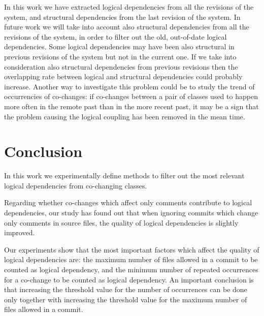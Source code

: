 \documentclass[conference]{IEEEtran}
\begin{document}
In this work we have extracted logical dependencies from all the revisions of the system, and structural dependencies from the last revision of the system. In future work we will take into account also structural dependencies from all the revisions of the system, in order to filter out the old, out-of-date logical dependencies.  Some logical dependencies may have been also structural in previous revisions of the system but not in the current one. If we take into consideration also structural dependencies from previous revisions then the overlapping rate between logical and structural dependencies could probably increase. Another way to investigate this problem could be to study the trend of occurrencies of co-changes: if co-changes between a pair of classes used to happen more often in the remote past than in the more recent past, it may be a sign that the problem causing the logical coupling has been removed in the mean time. 


   


\section{Conclusion}
\label{sec:Conclusion}
   
In this work we experimentally define methods to filter out the most relevant logical dependencies from co-changing classes. 

Regarding whether co-changes which affect only comments contribute to logical dependencies, our study has found out that when ignoring commits which change only comments in source files, the quality of logical dependencies is slightly improved.

Our experiments show that the most important factors which affect the quality of logical dependencies are: the maximum number of files allowed in a commit to be counted as logical dependency, and the minimum number of repeated occurrences for a co-change to be counted as logical dependency. An important conclusion is that increasing the threshold value for the number of occurrences can be done only together with increasing the threshold value for the maximum number of files allowed in a commit.

 	
 





%
\end{document}
